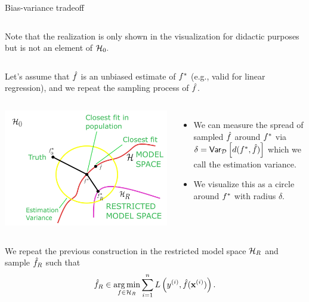 \documentclass[11pt,compress,t,notes=noshow, xcolor=table]{beamer}
\begin{document}
\begin{vbframe}{Bias-variance tradeoff}
\begin{columns}[onlytextwidth,T]
      \lz
      Note that the realization is only shown in the visualization for didactic purposes but is not an element of $\mathcal{H}_0.$
    
    \end{columns}

\framebreak

Let's assume that $\hat{f}$ is an unbiased estimate of $f^{\ast}$ (e.g., valid for linear regression), and we repeat the sampling process of $\hat{f}$.

\begin{columns}[onlytextwidth,T]

  \includegraphics[width=1.0\textwidth]{slides/regularization/figure_man/bv_anim_3.pdf}

      \lz 
      \begin{itemize}
          \item We can measure the spread of sampled $\hat{f}$ around $f^{\ast}$ via $\delta = \mathsf{Var}_{\mathcal{D}}\left[d(f^{\ast}, \hat{f})\right]$ which we call the estimation variance.
          \item We visualize this as a circle around $f^{\ast}$ with radius $\delta.$
      \end{itemize}
    \end{columns}

\framebreak

We repeat the previous construction in the restricted model space $\mathcal{H}_R$ and sample $\hat{f}_R$ such that 
$$\hat{f}_R \in \operatorname*{arg\,min}_{f\in\mathcal{H}_R} \sum\limits_{i=1}^n L\left(y^{(i)}, \hat{f} (\mathbf{x}^{(i)})\right).$$
\begin{columns}[onlytextwidth,T]


\end{columns}
\end{vbframe}
\end{document}
